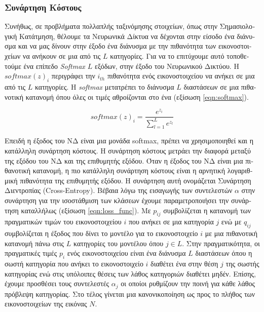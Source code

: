 \subsubsection{\textgreek{Συνάρτηση Κόστους}}
\label{sec:loss_function}
\textgreek{Συνήθως, σε προβλήματα πολλαπλής ταξινόμησης στοιχείων, όπως στην Σημασιολογική Κατάτμηση, θέλουμε τα Νευρωνικά Δίκτυα να δέχονται στην είσοδο ένα διάνυσμα και να μας δίνουν στην έξοδο ένα διάνυσμα με την πιθανότητα των εικονοστοιχείων να ανήκουν σε μια από τις $L$ κατηγορίες. Για να το επιτύχουμε αυτό τοποθετούμε ένα επίπεδο }\emph{Softmax $L$ }\textgreek{εξόδων, στην έξοδο του Νευρωνικού Δικτύου. Η }$softmax(z)_{i}$ \textgreek{περιγράφει την }$i_{th}$ \textgreek{πιθανότητα ενός εικονοστοιχείου να ανήκει σε μια από τις $L$ κατηγορίες. Η } \emph{softmax} \textgreek{μετατρέπει το διάνυσμα $L$ διαστάσεων σε μια πιθανοτική κατανομή όπου όλες οι τιμές αθροίζονται στο ένα (εξίσωση }\ref{eqn:softmax}).

\begin{equation}
  \label{eqn:softmax}
  \mathit{softmax(z)_{i}} = \frac{e^{z_{i}}}{\sum_{l=1}^{L} e^{z_{l}}}
\end{equation}

\textgreek{Επειδή η έξοδος του ΝΔ είναι μια μονάδα }softmax, \textgreek{πρέπει να χρησιμοποιηθεί και η κατάλληλη συνάρτηση κόστους. Η συνάρτηση κόστους μετράει την διαφορά μεταξύ της εξόδου του ΝΔ και της επιθυμητής εξόδου. Όταν η έξοδος του ΝΔ είναι μια πιθανοτική κατανομή, η πιο κατάλληλη συνάρτηση κόστους είναι η αρνητική λογαριθμική πιθανότητα της επιθυμητής εξόδου. Η συνάρτηση αυτή ονομάζεται Συνάρτηση Διεντροπίας }(Cross-Entropy). \textgreek{Βέβαια λόγω της εισαγωγής των συντελεστών $\alpha$ στην συνάρτηση για την ισοστάθμιση των κλάσεων έχουμε παραμετροποιήσει την συνάρτηση καταλλήλως (εξίσωση }\ref{eqn:loss_func}). \textgreek{Με $p_{ij}$ συμβολίζεται η κατανομή των πραγματικών τιμών του εικονοστοιχείου $i$ που ανήκει σε μια κατηγορία $j$ ενώ με $q_{ij}$ συμβολίζεται η έξοδος που δίνει το μοντέλο για το εικονοστοιχείο $i$ με μια πιθανοτική κατανομή πάνω στις $L$ κατηγορίες του μοντέλου όπου $j\in L$. Στην πραγματικότητα, οι πραγματικές τιμές $p_{i}$ ενός εικονοστοιχείου είναι ένα διάνυσμα $L$ διαστάσεων όπου η σωστή κατηγορία που ανήκει το εικονοστοιχείο $i$ διαθέτει ένα στην θέση $j$ της σωστής κατηγορίας ενώ στις υπόλοιπες θέσεις των λάθος κατηγοριών διαθέτει μηδέν. Επίσης, έχουμε προσθέσει τους συντελεστές $\alpha_j$ οι οποίοι ρυθμίζουν την ποινή για κάθε λάθος πρόβλεψη κατηγορίας. Στο τέλος γίνεται μια κανονικοποίηση ως προς το πλήθος των εικονοστοιχείων της εικόνας $N$.}

